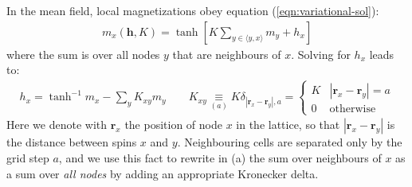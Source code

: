 \documentclass[../../main.tex]{subfiles}
\begin{document}
In the mean field, local magnetizations obey equation (\ref{eqn:variational-sol}):
\begin{align}
    \label{eqn:var-sol2}
    m_x(\bm{h}, K) = \tanh \left[K \sum_{y \in \langle y, x\rangle} m_y + h_x\right]
\end{align}
where the sum is over all nodes $y$ that are neighbours of $x$. Solving for $h_x$ leads to:
\begin{align}\label{eqn:hx-step}
    h_x = \tanh^{-1} m_x - \sum_y K_{xy} m_y \qquad K_{xy} \underset{(a)}{\equiv}  K \delta_{|\bm{r}_x-\bm{r}_y|,a} = \begin{cases}
        K & |\bm{r}_x-\bm{r}_y|=a\\
        0 & \text{otherwise}
    \end{cases}
\end{align} 
Here we denote with $\bm{r}_x$ the position of node $x$ in the lattice, so that $|\bm{r}_x - \bm{r}_y|$ is the distance between spins $x$ and $y$. Neighbouring cells are separated only by the grid step $a$, and we use this fact to rewrite in (a) the sum over neighbours of $x$ as a sum over \textit{all nodes} by adding an appropriate Kronecker delta. 

\medskip
\end{document}
